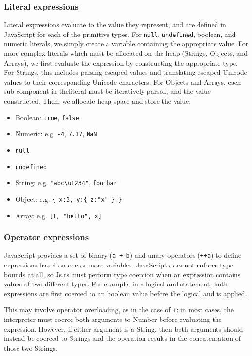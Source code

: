 \documentclass{article}
\begin{document}
\begin{multicols}{2}
\subsubsection*{Literal expressions}

Literal expressions evaluate to the value they represent, and are defined in
JavaScript for each of the primitive types. For \texttt{null},
\texttt{undefined}, boolean, and numeric literals, we simply create a variable
containing the appropriate value. For more complex literals which must be
allocated on the heap (Strings, Objects, and Arrays), we first evaluate the
expression by constructing the appropriate type. For Strings, this includes
parsing escaped values and translating escaped Unicode values to their
corresponding Unicode characters. For Objects and Arrays, each sub-component in
theliteral must be iteratively parsed, and the value constructed. Then, we
allocate heap space and store the value.

\begin{itemize}
  \item Boolean: \texttt{true}, \texttt{false}
  \item Numeric: e.g. \texttt{-4}, \texttt{7.17}, \texttt{NaN}
  \item \texttt{null}
  \item \texttt{undefined}
  \item String: e.g. \texttt{"abc\textbackslash u1234"},
    \texttt{\textquotesingle foo bar\textquotesingle}
  \item Object: e.g. \texttt{\{ x:3, y:\{ z:"x" \} \} }
  \item Array: e.g. \texttt{[1, "hello", x]}
\end{itemize}

\subsubsection*{Operator expressions}

JavaScript provides a set of binary (\texttt{a + b}) and unary operators
(\texttt{++a}) to define expressions based on one or more variables. JavaScript
does not enforce type bounds at all, so Js.rs must perform type coercion when an
expression contains values of two different types. For example, in a logical
and statement, both expressions are first coerced to an boolean value before the
logical and is applied.\newline

This may involve operator overloading, as in the case of \texttt{+}: in most cases, the
interpreter must coerce both arguments to Number before evaluating the
expression. However, if either argument is a String, then both
arguments should instead be coerced to Strings and the operation results in the
concatentation of those two Strings. \newline


\end{multicols}
\end{document}
